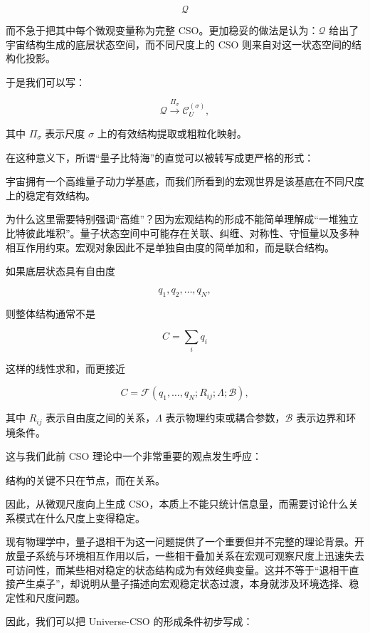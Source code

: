 \[
\mathcal{Q}
\]

而不急于把其中每个微观变量称为完整 CSO。更加稳妥的做法是认为：$\mathcal{Q}$ 给出了宇宙结构生成的底层状态空间，而不同尺度上的 CSO 则来自对这一状态空间的结构化投影。

于是我们可以写：

\[
\boxed{
\mathcal{Q}
\xrightarrow{\Pi_{\sigma}}
\mathcal{C}^{(\sigma)}_{U},
}
\]

其中 $\Pi_{\sigma}$ 表示尺度 $\sigma$ 上的有效结构提取或粗粒化映射。

在这种意义下，所谓“量子比特海”的直觉可以被转写成更严格的形式：

\begin{statementbox}
宇宙拥有一个高维量子动力学基底，而我们所看到的宏观世界是该基底在不同尺度上的稳定有效结构。
\end{statementbox}

为什么这里需要特别强调“高维”？因为宏观结构的形成不能简单理解成“一堆独立比特彼此堆积”。量子状态空间中可能存在关联、纠缠、对称性、守恒量以及多种相互作用约束。宏观对象因此不是单独自由度的简单加和，而是联合结构。

如果底层状态具有自由度

\[
q_1,q_2,\ldots,q_N,
\]

则整体结构通常不是

\[
C
=
\sum_i q_i
\]

这样的线性求和，而更接近

\[
C
=
\mathcal{F}
\left(
q_1,\ldots,q_N;
R_{ij};
\Lambda;
\mathcal{B}
\right),
\]

其中 $R_{ij}$ 表示自由度之间的关系，$\Lambda$ 表示物理约束或耦合参数，$\mathcal{B}$ 表示边界和环境条件。

这与我们此前 CSO 理论中一个非常重要的观点发生呼应：

\begin{statementbox}
结构的关键不只在节点，而在关系。
\end{statementbox}

因此，从微观尺度向上生成 CSO，本质上不能只统计信息量，而需要讨论什么关系模式在什么尺度上变得稳定。

现有物理学中，量子退相干为这一问题提供了一个重要但并不完整的理论背景。开放量子系统与环境相互作用以后，一些相干叠加关系在宏观可观察尺度上迅速失去可访问性，而某些相对稳定的状态结构成为有效经典变量。这并不等于“退相干直接产生桌子”，却说明从量子描述向宏观稳定状态过渡，本身就涉及环境选择、稳定性和尺度问题。

因此，我们可以把 Universe-CSO 的形成条件初步写成：

